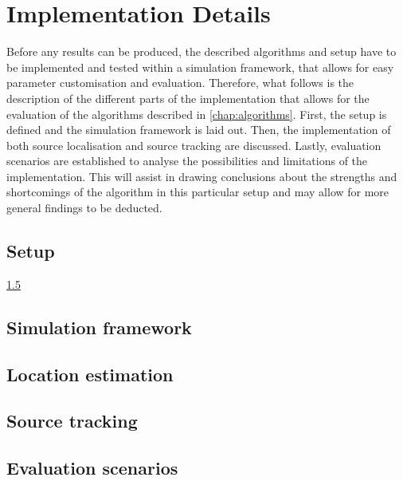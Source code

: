 \chapter{Implementation Details}
Before any results can be produced, the described algorithms and setup have to be implemented and tested within a simulation framework, that allows for easy parameter customisation and evaluation. Therefore, what follows is the description of the different parts of the implementation that allows for the evaluation of the algorithms described in \ref{chap:algorithms}. First, the setup is defined and the simulation framework is laid out. Then, the implementation of both source localisation and source tracking are discussed. Lastly, evaluation scenarios are established to analyse the possibilities and limitations of the implementation. This will assist in drawing conclusions about the strengths and shortcomings of the algorithm in this particular setup and may allow for more general findings to be deducted.

\section{Setup}
\label{sec:setup}
\ref{}

\section{Simulation framework}
\section{Location estimation}
\section{Source tracking}
\section{Evaluation scenarios}